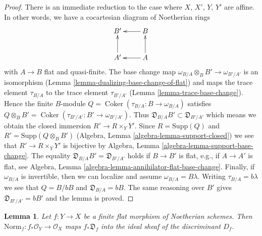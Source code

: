\documentclass{stacks-project}
\theoremstyle{plain}
\newtheorem{lemma}[subsection]{Lemma}
\theoremstyle{definition}
\theoremstyle{remark}
\numberwithin{equation}{subsection}
\def\Coker{\mathop{\mathrm{Coker}}}
\begin{document}
\begin{proof}
There is an immediate reduction to the case where $X$, $X'$, $Y$, $Y'$
are affine. In other words, we have a cocartesian diagram of Noetherian
rings
$$
\xymatrix{
B' & B \ar[l] \\
A' \ar[u] & A \ar[l] \ar[u]
}
$$
with $A \to B$ flat and quasi-finite. The base change map
$\omega_{B/A} \otimes_B B' \to \omega_{B'/A'}$ is an isomorphism
(Lemma \ref{lemma-dualizing-base-change-of-flat}) and maps
the trace element $\tau_{B/A}$ to the trace element $\tau_{B'/A'}$
(Lemma \ref{lemma-trace-base-change}).
Hence the finite $B$-module $Q = \Coker(\tau_{B/A} : B \to \omega_{B/A})$
satisfies $Q \otimes_B B' = \Coker(\tau_{B'/A'} : B' \to \omega_{B'/A'})$.
Thus $\mathfrak{D}_{B/A}B' \subset \mathfrak{D}_{B'/A'}$ which means
we obtain the closed immersion $R' \to R \times_Y Y'$.
Since $R = \text{Supp}(Q)$ and $R' = \text{Supp}(Q \otimes_B B')$
(Algebra, Lemma \ref{algebra-lemma-support-closed})
we see that $R' \to R \times_Y Y'$ is bijective by
Algebra, Lemma \ref{algebra-lemma-support-base-change}.
The equality $\mathfrak{D}_{B/A}B' = \mathfrak{D}_{B'/A'}$ holds
if $B \to B'$ is flat, e.g., if $A \to A'$ is flat, see
Algebra, Lemma \ref{algebra-lemma-annihilator-flat-base-change}.
Finally, if $\omega_{B/A}$ is invertible, then we can localize
and assume $\omega_{B/A} = B \lambda$. Writing $\tau_{B/A} = b\lambda$
we see that $Q = B/bB$ and $\mathfrak{D}_{B/A} = bB$.
The same reasoning over $B'$
gives $\mathfrak{D}_{B'/A'} = bB'$ and the lemma is proved.
\end{proof}

\begin{lemma}
\label{lemma-norm-different-in-discriminant}
Let $f : Y \to X$ be a finite flat morphism of Noetherian schemes.
Then $\text{Norm}_f : f_*\mathcal{O}_Y \to \mathcal{O}_X$ maps
$f_*\mathfrak{D}_f$ into the ideal sheaf of the discriminant $D_f$.
\end{lemma}
\end{document}
